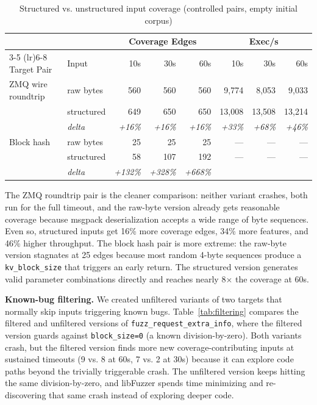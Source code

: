 \documentclass[11pt]{article}
\begin{document}
\begin{table}[H]
\centering
\caption{Structured vs. unstructured input coverage (controlled pairs, empty initial corpus)}
\label{tab:structured_comparison}
\footnotesize
\begin{tabular}{@{}llrrrrrr@{}}
\toprule
 & & \multicolumn{3}{c}{Coverage Edges} & \multicolumn{3}{c}{Exec/s} \\
\cmidrule(lr){3-5} \cmidrule(lr){6-8}
Target Pair & Input & 10s & 30s & 60s & 10s & 30s & 60s \\
\midrule
ZMQ wire roundtrip & raw bytes     & 560 & 560 & 560 & 9,774  & 8,053  & 9,033 \\
                   & structured    & 649 & 650 & 650 & 13,008 & 13,508 & 13,214 \\
                   & \textit{delta} & \textit{+16\%} & \textit{+16\%} & \textit{+16\%} & \textit{+33\%} & \textit{+68\%} & \textit{+46\%} \\
\addlinespace
Block hash         & raw bytes     & 25  & 25  & 25  & ---    & ---    & --- \\
                   & structured    & 58  & 107 & 192 & ---    & ---    & --- \\
                   & \textit{delta} & \textit{+132\%} & \textit{+328\%} & \textit{+668\%} & & & \\
\bottomrule
\end{tabular}
\end{table}

The ZMQ roundtrip pair is the cleaner comparison: neither variant crashes, both run for the full timeout, and the raw-byte version already gets reasonable coverage because msgpack deserialization accepts a wide range of byte sequences. Even so, structured inputs get 16\% more coverage edges, 34\% more features, and 46\% higher throughput. The block hash pair is more extreme: the raw-byte version stagnates at 25 edges because most random 4-byte sequences produce a \texttt{kv\_block\_size} that triggers an early return. The structured version generates valid parameter combinations directly and reaches nearly 8$\times$ the coverage at 60s.

\textbf{Known-bug filtering.} We created unfiltered variants of two targets that normally skip inputs triggering known bugs. Table~\ref{tab:filtering} compares the filtered and unfiltered versions of \texttt{fuzz\_request\_extra\_info}, where the filtered version guards against \texttt{block\_size=0} (a known division-by-zero). Both variants crash, but the filtered version finds more new coverage-contributing inputs at sustained timeouts (9 vs. 8 at 60s, 7 vs. 2 at 30s) because it can explore code paths beyond the trivially triggerable crash. The unfiltered version keeps hitting the same division-by-zero, and libFuzzer spends time minimizing and re-discovering that same crash instead of exploring deeper code.
\end{document}
